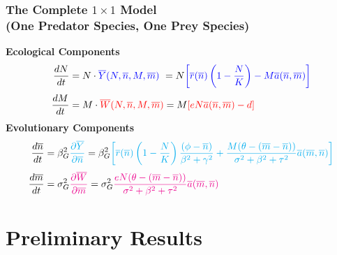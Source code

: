 \documentclass[10pt]{beamer}
\begin{document}
\begin{frame}
	\frametitle{The Complete $1\times1$ Model \\ (One Predator Species, One Prey Species)}
	{\bf Ecological Components}
	\begin{align*}
		\frac{dN}{dt} &= N\cdot {\color{blue}\overline{Y}(N, \overline{n}, M, \overline{m})}\ = N{\color{blue}\left[\overline{r}(\overline{n})\left(1 - \frac{N}{K}\right) - M\overline{a}(\overline{n}, \overline{m})\right]}\\[.1cm]
		\frac{dM}{dt} &= M\cdot {\color{red}\overline{W}(N, \overline{n}, M, \overline{m})} = M{\color{red}\left[eN\overline{a}(\overline{n}, \overline{m}) - d\right]}
	\end{align*}
	{\bf Evolutionary Components}
	\begin{align*}
		\frac{d\overline{n}}{dt} &= \beta_G^2{\color{cyan}\frac{\partial \overline{Y}}{\partial \overline{n}}} = \beta_G^2{\color{cyan}\left[\overline{r}(\overline{n})\left(1 - \frac{N}{K}\right)\frac{(\phi - \overline{n})}{\beta^2 + \gamma^2} + \frac{M(\theta - (\overline{m} - \overline{n}))}{\sigma^2 + \beta^2 + \tau^2} \overline{a}(\overline{m}, \overline{n})\right]}\\[.1cm]
		\frac{d\overline{m}}{dt} &= \sigma_G^2{\color{magenta}\frac{\partial \overline{W}}{\partial \overline{m}}} = \sigma_G^2{\color{magenta}\frac{eN(\theta - (\overline{m} - \overline{n}))}{\sigma^2 + \beta^2 + \tau^2} \overline{a}(\overline{m}, \overline{n})}
	\end{align*}
\end{frame}







\section{Preliminary Results}
\end{document}
